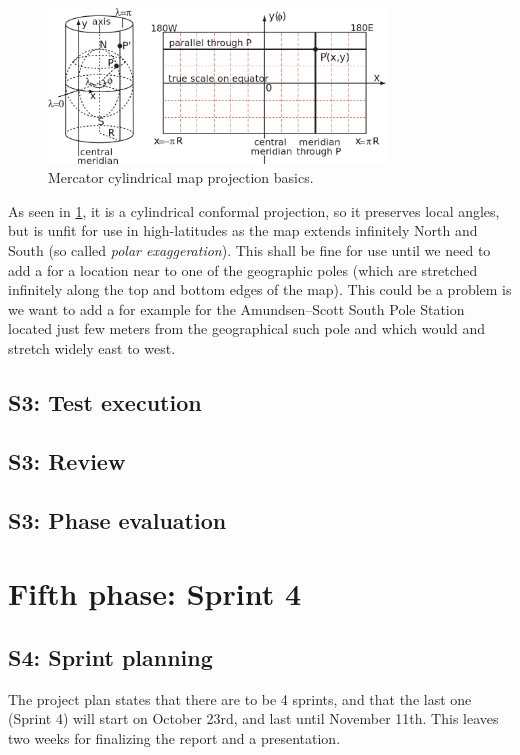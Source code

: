 \documentclass[11pt]{book}
\begin{document}
\begin{figure}[H]
    \centering
    \includegraphics[width=0.8\textwidth]{Figures/Prestudy/mercator.png}
    \caption{Mercator cylindrical map projection basics. \cite{wikipedia:mercator}}
    \label{fig:mercator}
\end{figure}

As seen in \ref{fig:mercator}, it is a cylindrical conformal projection, so it preserves local angles, but is unfit for use in high-latitudes as the map extends infinitely North and South (so called \emph{polar exaggeration}). This shall be fine for use until we need to add a \wallentitys for a location near to one of the geographic poles (which are stretched infinitely along the top and bottom edges of the map). This could be a problem is we want to add a \wallentitys for example for the Amundsen–Scott South Pole Station located just few meters from the geographical such pole and which would and stretch widely east to west. \cite{progonos:mercator,radicalcartography} 


\subsection{S3: Test execution}
\subsection{S3: Review}
\subsection{S3: Phase evaluation}

\section{Fifth phase: Sprint 4}

\subsection{S4: Sprint planning}
The project plan states that there are to be 4 sprints, and that the last one (Sprint 4) will start on October 23rd, and last until November 11th. This leaves two weeks for finalizing the report and a presentation.
\end{document}
